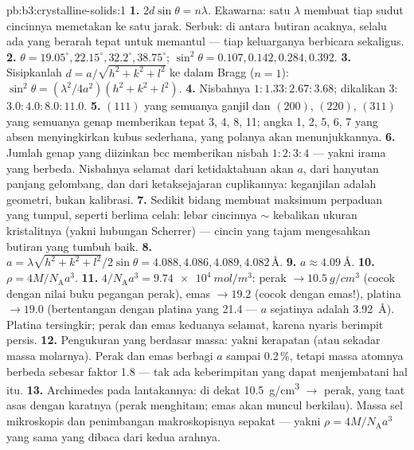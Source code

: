 \begin{solution}{pb:b3:crystalline-solids:1}
\textbf{1.} $2d\sin\theta = n\lambda$. Ekawarna: satu
$\lambda$ membuat tiap sudut cincinnya memetakan ke satu jarak. Serbuk: di antara
butiran acaknya, selalu ada yang berarah tepat untuk memantul --- tiap
keluarganya berbicara sekaligus.
\textbf{2.} $\theta = 19.05^\circ, 22.15^\circ, 32.2^\circ,
38.75^\circ$; $\sin^2\theta = 0.107, 0.142, 0.284, 0.392$.
\textbf{3.} Sisipkanlah $d = a/\sqrt{h^2+k^2+l^2}$ ke dalam Bragg
($n = 1$): $\sin^2\theta = (\lambda^2/4a^2)(h^2+k^2+l^2)$.
\textbf{4.} Nisbahnya $1 : 1.33 : 2.67 : 3.68$; dikalikan 3:
$3.0 : 4.0 : 8.0 : 11.0$.
\textbf{5.} $(111)$ yang semuanya ganjil dan $(200)$, $(220)$,
$(311)$ yang semuanya genap memberikan tepat 3, 4, 8, 11; angka 1, 2, 5, 6, 7
yang absen menyingkirkan kubus sederhana, yang polanya akan menunjukkannya.
\textbf{6.} Jumlah genap yang diizinkan bcc memberikan nisbah
$1:2:3:4$ --- yakni irama yang berbeda. Nisbahnya selamat dari ketidaktahuan
akan $a$, dari hanyutan panjang gelombang, dan dari ketaksejajaran cuplikannya:
keganjilan adalah geometri, bukan kalibrasi.
\textbf{7.} Sedikit bidang membuat maksimum perpaduan yang tumpul, seperti
 berlima celah: lebar cincinnya $\sim$ kebalikan ukuran kristalitnya
(yakni hubungan Scherrer) --- cincin yang tajam mengesahkan butiran yang
tumbuh baik.
\textbf{8.} $a = \lambda\sqrt{h^2+k^2+l^2}/2\sin\theta = 4.088,
4.086, 4.089, 4.082\,\unit{\angstrom}$.
\textbf{9.} $a \approx \qty{4.09}{\angstrom}$.
\textbf{10.} $\rho = 4M/N_{\text{A}}a^3$.
\textbf{11.} $4/N_{\text{A}}a^3 = \qty{9.74e4}{mol/m^3}$:
perak $\to \qty{10.5}{g/cm^3}$ (cocok dengan nilai buku pegangan
perak), emas $\to 19.2$ (cocok dengan emas!), platina $\to 19.0$
(bertentangan dengan platina yang 21.4 --- $a$ sejatinya adalah
\qty{3.92}{\angstrom}). Platina tersingkir; perak dan emas keduanya
selamat, karena  nyaris berimpit persis.
\textbf{12.} Pengukuran yang berdasar massa: yakni kerapatan (atau sekadar massa
molarnya). Perak dan emas berbagi $a$ sampai 0.2\,\%, tetapi massa atomnya
berbeda sebesar faktor 1.8 --- tak ada keberimpitan  yang dapat
menjembatani hal itu.
\textbf{13.} Archimedes pada lantakannya: di dekat \qty{10.5}{g/cm^3}
$\to$ perak, yang taat asas dengan karatnya (perak menghitam;
emas akan muncul berkilau). Massa sel mikroskopis dan
penimbangan makroskopisnya sepakat --- yakni
$\rho = 4M/N_{\text{A}}a^3$ yang sama yang dibaca dari kedua arahnya.

\end{solution}
